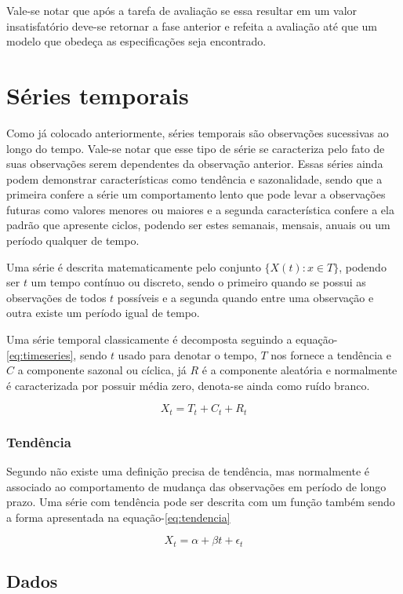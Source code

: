 \documentclass[
	12pt,
	oneside,
	a4paper,
	english,
	brazil
]{abntex2}
\begin{document}
Vale-se notar que após a tarefa de avaliação se essa resultar em um valor 
insatisfatório deve-se retornar a fase anterior e refeita a avaliação até que um 
modelo que obedeça as especificações seja encontrado.

\chapter{Séries temporais}

Como já colocado anteriormente, séries temporais são observações sucessivas ao 
longo do tempo. Vale-se notar que esse tipo de série se caracteriza pelo fato de 
suas observações serem dependentes da observação anterior. Essas séries ainda 
podem demonstrar características como tendência e sazonalidade, sendo que a 
primeira confere a série um comportamento lento que pode levar a observações 
futuras como valores menores ou maiores e a segunda característica confere a ela 
padrão que apresente ciclos, podendo ser estes semanais, mensais, anuais ou um 
período qualquer de tempo.

Uma série é descrita matematicamente pelo conjunto $\{X(t): x \in T\}$, podendo 
ser $t$ um tempo contínuo ou discreto, sendo o primeiro quando se possui as 
observações de todos $t$ possíveis e a segunda quando entre uma observação e 
outra existe um período igual de tempo.

Uma série temporal classicamente é decomposta seguindo a 
equação-\ref{eq:timeseries}, sendo $t$ usado para denotar o tempo, $T$ nos 
fornece a tendência e $C$ a componente sazonal ou cíclica, já $R$ é a componente 
aleatória e normalmente é caracterizada por possuir média zero, denota-se ainda 
como ruído branco.

\begin{equation}
	\label{eq:timeseries}
	X_t = T_t + C_t + R_t
\end{equation}

\subsection{Tendência}

Segundo  não existe uma definição precisa de tendência, mas 
normalmente é associado ao comportamento de mudança das observações em período 
de longo prazo. Uma série com tendência pode ser descrita com um função também 
sendo a forma apresentada na equação-\ref{eq:tendencia}

\begin{equation}
	\label{eq:tendencia}
	X_t = \alpha + \beta{}t + \epsilon{}_t
\end{equation}

\section{Dados}

\postextual


\end{document}
